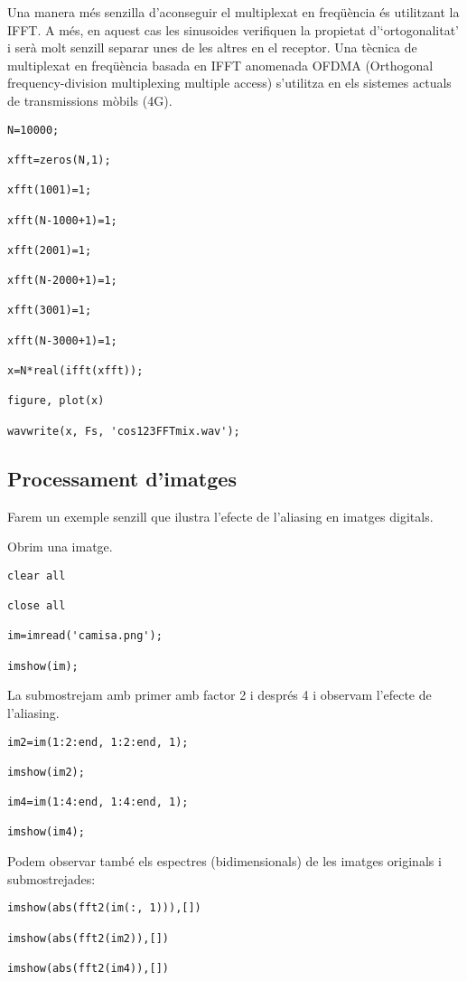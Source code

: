 \documentclass{article}
\begin{document}
Una manera més senzilla d'aconseguir el multiplexat en freqüència és utilitzant la IFFT.
A més, en aquest cas les sinusoides verifiquen la propietat
d'`ortogonalitat' i serà molt senzill separar unes de les altres en el receptor.
Una tècnica de multiplexat en freqüència basada en IFFT anomenada OFDMA
(Orthogonal frequency-division multiplexing multiple access) s'utilitza en els sistemes actuals de transmissions
mòbils (4G).


\begin{verbatim}
N=10000;

xfft=zeros(N,1);

xfft(1001)=1;

xfft(N-1000+1)=1;

xfft(2001)=1;

xfft(N-2000+1)=1;

xfft(3001)=1;

xfft(N-3000+1)=1;

x=N*real(ifft(xfft));

figure, plot(x)

wavwrite(x, Fs, 'cos123FFTmix.wav');
\end{verbatim}



\subsection{Processament d'imatges}

Farem un exemple senzill que ilustra l'efecte de l'aliasing en imatges digitals.

Obrim una imatge.
\begin{verbatim}
clear all

close all

im=imread('camisa.png');

imshow(im);
\end{verbatim}

La submostrejam amb primer amb factor 2 i després 4 i observam l'efecte de l'aliasing.

\begin{verbatim}
im2=im(1:2:end, 1:2:end, 1);

imshow(im2);

im4=im(1:4:end, 1:4:end, 1);

imshow(im4);
\end{verbatim}

Podem observar també els espectres (bidimensionals) de les imatges originals i submostrejades:

\begin{verbatim}
imshow(abs(fft2(im(:, 1))),[])

imshow(abs(fft2(im2)),[])

imshow(abs(fft2(im4)),[])
\end{verbatim}
\end{document}
